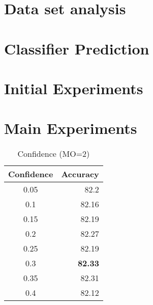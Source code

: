 \documentclass[12pt]{article}
\begin{document}

\section{Data set analysis}

\section{Classifier Prediction}



\section{Initial Experiments}



\section{Main Experiments}

\begin{table}[htbp]
  \centering
  \caption{Confidence (MO=2)}
    \begin{tabular}{c|r}
    \toprule
    \multicolumn{1}{l|}{Confidence} & \multicolumn{1}{l}{Accuracy} \\
    \midrule
    0.05  & 82.2 \\
    0.1   & 82.16 \\
    0.15  & 82.19 \\
    0.2   & 82.27 \\
    0.25  & 82.19 \\
    0.3   & \textbf{82.33} \\
    0.35  & 82.31 \\
    0.4   & 82.12 \\
    \bottomrule
    \end{tabular}%
  \label{tab:addlabel}%
\end{table}%
\end{document}
